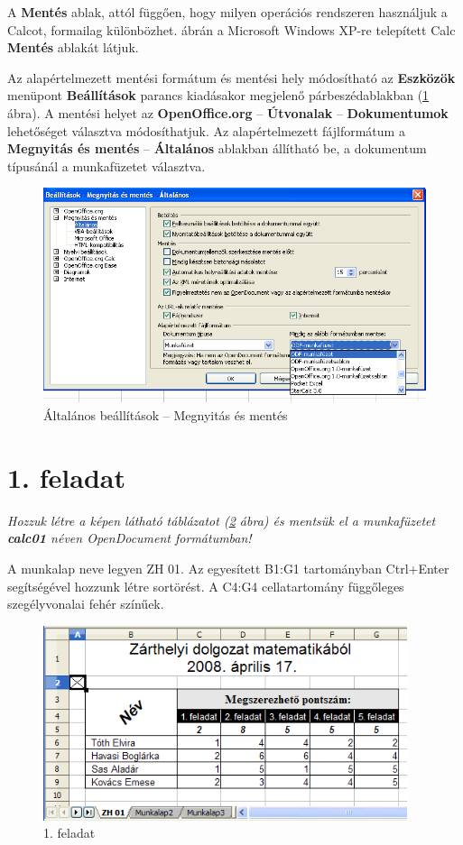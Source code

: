 A \textbf{Mentés} ablak, attól függően, hogy milyen
operációs rendszeren használjuk a Calcot, formailag
különbözhet.  ábrán a Microsoft Windows XP-re
telepített Calc \textbf{Mentés} ablakát látjuk.

Az alapértelmezett mentési formátum és mentési hely
módosítható az \textbf{Eszközök} menüpont
\textbf{Beállítások} parancs kiadásakor megjelenő
párbeszédablakban (\ref{MegnyitásMentés} ábra).
A mentési helyet az \textbf{OpenOffice.org} --
\textbf{Útvonalak} --  \textbf{Dokumentumok} lehetőséget
választva módosíthatjuk. Az alapértelmezett  fájlformátum
 a \textbf{Megnyitás és mentés} -- \textbf{Általános}
ablakban állítható be, a dokumentum típusánál a
munkafüzetet választva.

\begin{figure}[!h]
\begin{center}
\includegraphics[width=14.999cm]{oocalcv1-img18.png}
\caption{Általános beállítások --  Megnyitás és mentés}\label{MegnyitásMentés}
\end{center}
\end{figure}


\section{1. feladat}

{\itshape
Hozzuk létre a képen látható táblázatot (\ref{1-feladat} ábra) és
mentsük el a munkafüzetet \textbf{calc01} néven OpenDocument
formátumban!}

A munkalap neve legyen ZH 01. Az egyesített B1:G1 tartományban
Ctrl+Enter segítségével hozzunk létre sortörést. A C4:G4
cellatartomány függőleges szegélyvonalai fehér
színűek.

\begin{figure}[!h]
\begin{center}
\includegraphics[width=10.673cm]{oocalcv1-img19.png}
\caption{1. feladat}\label{1-feladat}
\end{center}
\end{figure}

